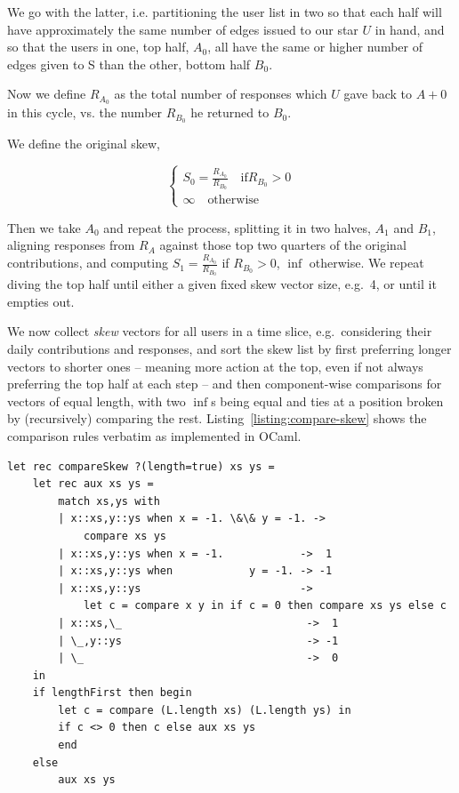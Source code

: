 \documentclass[10pt,oneside]{memoir}
\begin{document}
We go with the latter, i.e. partitioning the user list in two so that each half will have approximately the same number of edges issued to our star $U$ in hand, and so that the users in one, top half, $A_0$, all have the same or higher number of edges given to S than the other, bottom half $B_0$.

Now we define $R_{A_0}$ as the total number of responses  which $U$ gave back to $A+0$ in this cycle, vs. the number $R_{B_0}$ he returned to $B_0$.

We define the original skew,

\[
\left\lbrace
\begin{array}{l}
    S_0 = \frac{R_{A_0}}{R_{B_0}} \quad\mbox{if} R_{B_0} > 0 \\
    \infty \quad\mbox{otherwise} 
\end{array}
\right.
\]

Then we take $A_0$ and repeat the process, splitting it in two halves, $A_1$ and $B_1$, aligning responses from $R_A$ against those top two quarters of the original contributions, and computing $S_1 = \frac{R_{A_0}}{R_{B_0}}$ if $R_{B_0} > 0$, $\inf$ otherwise.
We repeat diving the top half until either a given fixed skew vector size, e.g.\ 4, or until it empties out.


We now collect {\itshape skew} vectors for all users in a time slice, e.g.\ considering their daily contributions and responses, and sort the skew list by first preferring longer vectors to shorter ones -- meaning more action at the top, even if not always preferring the top half at each step -- and then component-wise comparisons for vectors of equal length, with two $\inf$s being equal and ties at a position broken by (recursively) comparing the rest.  Listing~\ref{listing:compare-skew} shows the comparison rules verbatim as implemented in OCaml.


\begin{verbatim}
let rec compareSkew ?(length=true) xs ys =
    let rec aux xs ys =
        match xs,ys with
        | x::xs,y::ys when x = -1. \&\& y = -1. ->
            compare xs ys
        | x::xs,y::ys when x = -1.            ->  1
        | x::xs,y::ys when            y = -1. -> -1
        | x::xs,y::ys                         -> 
            let c = compare x y in if c = 0 then compare xs ys else c
        | x::xs,\_                             ->  1
        | \_,y::ys                             -> -1
        | \_                                   ->  0
    in
    if lengthFirst then begin
        let c = compare (L.length xs) (L.length ys) in
        if c <> 0 then c else aux xs ys
        end
    else
        aux xs ys


\end{verbatim}
\end{document}
